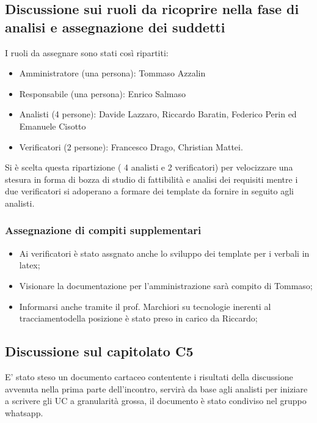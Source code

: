 \subsection{ Discussione sui ruoli da ricoprire nella fase di analisi e assegnazione dei suddetti}
I ruoli da assegnare sono stati così ripartiti: 
\begin{itemize}
\item Amministratore (una persona): Tommaso Azzalin
\item Responsabile (una persona): Enrico Salmaso
\item Analisti (4 persone): Davide Lazzaro, Riccardo Baratin, Federico Perin ed Emanuele Cisotto
\item Verificatori (2 persone): Francesco Drago, Christian Mattei.
\end{itemize}
Si è scelta questa ripartizione ( 4 analisti e 2 verificatori) per velocizzare una stesura in forma di 
bozza di studio di fattibilità e analisi dei requisiti mentre i due verificatori si adoperano a formare dei template
da fornire in seguito agli analisti.
\\
\subsubsection{Assegnazione di compiti supplementari}
\begin{itemize}
\item Ai verificatori è stato assgnato anche lo sviluppo dei template per i verbali in latex;
\item Visionare la documentazione per l'amministrazione sarà compito di Tommaso;
\item Informarsi anche tramite il prof. Marchiori su tecnologie inerenti al tracciamentodella posizione è stato preso in carico da Riccardo;
\end{itemize}
\subsection{Discussione sul capitolato C5}
E' stato steso un documento cartaceo contentente i risultati della discussione avvenuta nella prima parte dell'incontro, servirà da base agli analisti per iniziare a 
scrivere gli UC a granularità grossa, il documento è stato condiviso nel gruppo whatsapp.
\clearpage